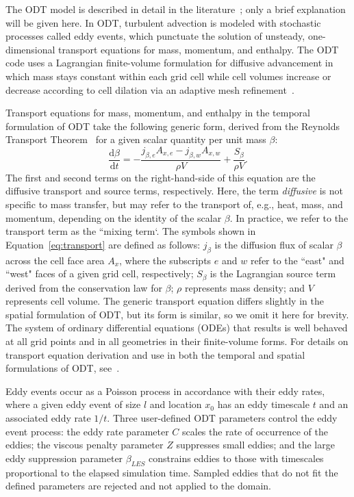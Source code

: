 \documentclass[preprint,12pt, a4paper]{elsarticle}
\begin{document}
The ODT model  is described in detail in the literature~\cite{Kerstein_1999,Kerstein_2001,Ashurst_2005,Lignell_2018,Lignell_2013}; only a brief explanation will be given here. In ODT, turbulent advection is modeled with stochastic processes called eddy events, which punctuate the solution of unsteady, one-dimensional transport equations for mass, momentum, and enthalpy. The ODT code  uses a Lagrangian finite-volume formulation for diffusive advancement in which mass stays constant within each grid cell while cell volumes increase or decrease according to cell dilation via an adaptive mesh refinement~\cite{Lignell_2013}.

Transport equations for mass, momentum, and enthalpy in the temporal formulation of ODT take the following generic form, derived from the Reynolds Transport Theorem~\cite{Cengel_2010} for a given scalar quantity per unit mass $\beta$: 
\begin{equation} 
\label{eq:transport}
	\frac{\mathrm{d}\beta}{\mathrm{d}t} = -\frac{j_{\beta,e}A_{x,e}-j_{\beta,w}A_{x,w}}{\rho V} + \frac{S_{\beta}}{\rho V}.
\end{equation}
The first and second terms on the right-hand-side of this equation are the diffusive transport and source terms, respectively. Here, the term \emph{diffusive} is not specific to mass transfer, but may refer to the transport of, e.g., heat, mass, and momentum, depending on the identity of the scalar $\beta$. In practice, we refer to the transport term as the ``mixing term`. The symbols shown in Equation~\ref{eq:transport} are defined as follows: $j_{\beta}$ is the diffusion flux of scalar $\beta$ across the cell face area $A_x$, where the subscripts $e$ and $w$ refer to the ``east" and ``west" faces of a given grid cell, respectively; $S_{\beta}$ is the Lagrangian source term derived from the conservation law for $\beta$; $\rho$ represents mass density; and $V$ represents cell volume. The generic transport equation differs slightly in the spatial formulation of ODT, but its form is similar, so we omit it here for brevity. The system of ordinary differential equations (ODEs) that results is well behaved at all grid points and in all geometries in their finite-volume forms. For details on transport equation derivation and use in both the temporal and spatial formulations of ODT, see~\cite{Lignell_2018}. 

Eddy events occur as a Poisson process in accordance with their eddy rates, where a given eddy event of size $l$ and location $x_0$ has an eddy timescale $t$ and an associated eddy rate $1/t$. Three user-defined ODT parameters control the eddy event process: the eddy rate parameter $C$ scales the rate of occurrence of the eddies; the viscous penalty parameter $Z$ suppresses small eddies; and the large eddy suppression parameter $\beta_{LES}$ constrains eddies to those with timescales proportional to the elapsed simulation time. Sampled eddies that do not fit the defined parameters are rejected and not applied to the domain.
\end{document}

